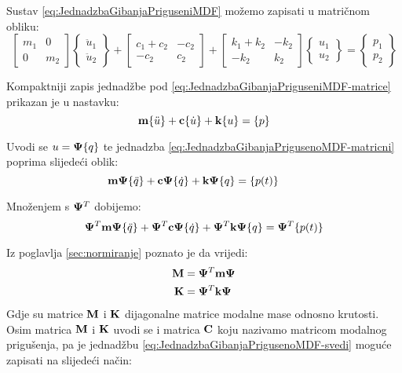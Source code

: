 Sustav \eqref{eq:JednadzbaGibanjaPriguseniMDF} možemo zapisati u matričnom obliku:
\begin{equation}\label{eq:JednadzbaGibanjaPriguseniMDF-matrice}
    \begin{bmatrix}
        m_1 & 0 \\
        0   & m_2
    \end{bmatrix}
    \begin{Bmatrix}
        \ddot{u}_1\\
        \ddot{u}_2
    \end{Bmatrix}
    +
    \begin{bmatrix}
        c_1 + c_2 & -c_2\\
        -c_2 & c_2
    \end{bmatrix}
    +
    \begin{bmatrix}
        k_1+k_2 & -k_2\\
        -k_2 & k_2
    \end{bmatrix}
    \begin{Bmatrix}
        u_1\\
        u_2
    \end{Bmatrix}
    =
    \begin{Bmatrix}
        p_1\\
        p_2 
    \end{Bmatrix}
\end{equation}

Kompaktniji zapis jednadžbe pod \eqref{eq:JednadzbaGibanjaPriguseniMDF-matrice} 
prikazan je u nastavku:
\begin{equation}\label{eq:JednadzbaGibanjaPrigusenoMDF-matricni}
    \mm\vtor{u}{:}+\cc\vtor{u}{.}+\kk\vtor{u}{} = \vtor{p}{}
\end{equation}

Uvodi se $u=\ppsi\vtor{q}{}$ te jednadzba \eqref{eq:JednadzbaGibanjaPrigusenoMDF-matricni}
poprima slijedeći oblik:
\begin{equation}
    \mm\ppsi\vtor{q}{:}+\cc\ppsi\vtor{q}{.}+\kk\ppsi\vtor{q}{}=\vtor{p(t)}{}\qquad 
\end{equation}

Množenjem s $\mathbf{\Psi}^T$ dobijemo:
\begin{equation}\label{eq:JednadzbaGibanjaPrigusenoMDF-svedi}
    \ppsi^T\mm\ppsi\vtor{q}{:}+\ppsi^T\cc\ppsi\vtor{q}{.}+\ppsi^T\kk\ppsi\vtor{q}{}=\ppsi^T\vtor{p(t)}{}\\
\end{equation}

Iz poglavlja \ref{sec:normiranje} poznato je da vrijedi:
\begin{align*}
    \mathbf{M} &= \mathbf{\Psi}^T\mathbf{m}\mathbf{\Psi}\\
    \mathbf{K} &= \mathbf{\Psi}^T\mathbf{k}\mathbf{\Psi}
\end{align*}
Gdje su matrice $\mathbf{M}$ i $\mathbf{K}$ dijagonalne matrice modalne mase odnosno krutosti. Osim
matrica $\mathbf{M}$ i $\mathbf{K}$ uvodi se i matrica $\mathbf{C}$ koju nazivamo matricom modalnog
prigušenja, pa je jednadžbu \eqref{eq:JednadzbaGibanjaPrigusenoMDF-svedi} moguće
zapisati na slijedeći način:

